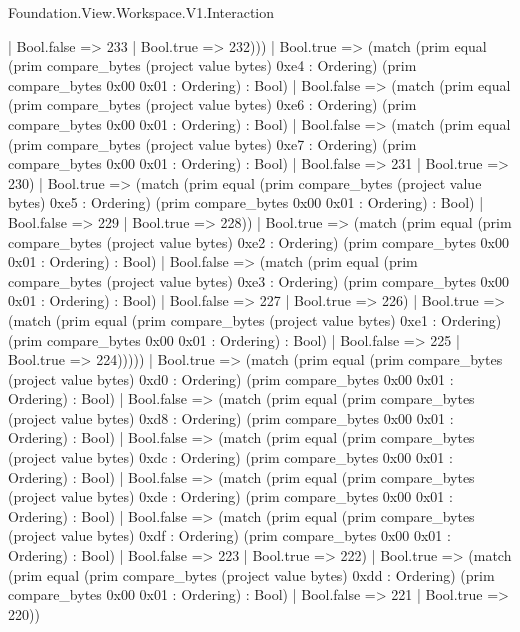 \begin{lexlean}{Foundation.View.Workspace.V1.Interaction}
\begin{semanticmodule}
{                    | Bool.false => 233
                    | Bool.true => 232)))
              | Bool.true => (match (prim equal (prim compare_bytes (project value bytes) 0xe4 : Ordering) (prim compare_bytes 0x00 0x01 : Ordering) : Bool)
                | Bool.false => (match (prim equal (prim compare_bytes (project value bytes) 0xe6 : Ordering) (prim compare_bytes 0x00 0x01 : Ordering) : Bool)
                  | Bool.false => (match (prim equal (prim compare_bytes (project value bytes) 0xe7 : Ordering) (prim compare_bytes 0x00 0x01 : Ordering) : Bool)
                    | Bool.false => 231
                    | Bool.true => 230)
                  | Bool.true => (match (prim equal (prim compare_bytes (project value bytes) 0xe5 : Ordering) (prim compare_bytes 0x00 0x01 : Ordering) : Bool)
                    | Bool.false => 229
                    | Bool.true => 228))
                | Bool.true => (match (prim equal (prim compare_bytes (project value bytes) 0xe2 : Ordering) (prim compare_bytes 0x00 0x01 : Ordering) : Bool)
                  | Bool.false => (match (prim equal (prim compare_bytes (project value bytes) 0xe3 : Ordering) (prim compare_bytes 0x00 0x01 : Ordering) : Bool)
                    | Bool.false => 227
                    | Bool.true => 226)
                  | Bool.true => (match (prim equal (prim compare_bytes (project value bytes) 0xe1 : Ordering) (prim compare_bytes 0x00 0x01 : Ordering) : Bool)
                    | Bool.false => 225
                    | Bool.true => 224)))))
          | Bool.true => (match (prim equal (prim compare_bytes (project value bytes) 0xd0 : Ordering) (prim compare_bytes 0x00 0x01 : Ordering) : Bool)
            | Bool.false => (match (prim equal (prim compare_bytes (project value bytes) 0xd8 : Ordering) (prim compare_bytes 0x00 0x01 : Ordering) : Bool)
              | Bool.false => (match (prim equal (prim compare_bytes (project value bytes) 0xdc : Ordering) (prim compare_bytes 0x00 0x01 : Ordering) : Bool)
                | Bool.false => (match (prim equal (prim compare_bytes (project value bytes) 0xde : Ordering) (prim compare_bytes 0x00 0x01 : Ordering) : Bool)
                  | Bool.false => (match (prim equal (prim compare_bytes (project value bytes) 0xdf : Ordering) (prim compare_bytes 0x00 0x01 : Ordering) : Bool)
                    | Bool.false => 223
                    | Bool.true => 222)
                  | Bool.true => (match (prim equal (prim compare_bytes (project value bytes) 0xdd : Ordering) (prim compare_bytes 0x00 0x01 : Ordering) : Bool)
                    | Bool.false => 221
                    | Bool.true => 220))
}
\end{semanticmodule}
\end{lexlean}
